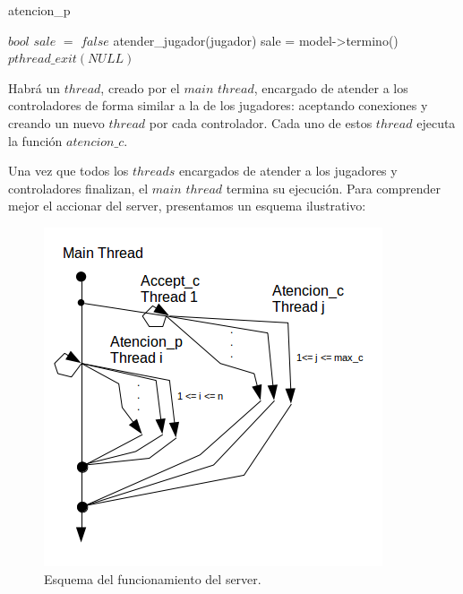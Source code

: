\begin{algorithm}[H]
\caption{atencion\_p}\label{ej1}
\begin{algorithmic}[1]
	\State $bool$ $sale$ $=$ $false$ 
		\State atender\_jugador(jugador)
		\State sale = model->termino()
	\EndWhile
	\State $pthread\_exit(NULL)$
\EndProcedure
\end{algorithmic}
\end{algorithm}

Habrá un $thread$, creado por el $main$ $thread$, encargado de atender a los controladores de forma similar a la de los jugadores: aceptando conexiones y creando un nuevo $thread$ por cada controlador. Cada uno de estos $thread$ ejecuta la función $atencion\_c$.

Una vez que todos los $threads$ encargados de atender a los jugadores y controladores finalizan, el $main$ $thread$ termina su ejecución. Para comprender mejor el accionar del server, presentamos un esquema ilustrativo:


\begin{figure}[H]
\centering\includegraphics[scale=0.7]{imgs/server.png}
\caption{Esquema del funcionamiento del server.}
\end{figure}

